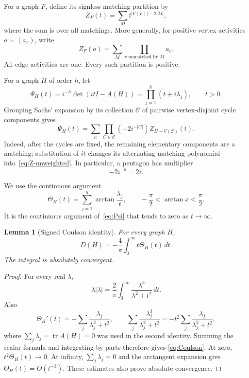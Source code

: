 \documentclass[11pt]{article}
\newtheorem{lemma}[theorem]{Lemma}
\theoremstyle{remark}
\newcommand{\tr}{\operatorname{tr}}
\begin{document}
For a graph $F$, define its signless matching partition by
\begin{equation}\label{eq:Z-unweighted}
 Z_F(t)=\sum_M t^{|V(F)|-2|M|},
\end{equation}
where the sum is over all matchings.  More generally, for positive vertex
activities $a=(a_v)$, write
\begin{equation}\label{eq:Z-weighted}
 Z_F(a)=\sum_M\prod_{v\text{ unmatched by }M}a_v.
\end{equation}
All edge activities are one.  Every such partition is positive.

For a graph $H$ of order $h$, let
\begin{equation}\label{eq:Psi}
 \Psi_H(t)=i^{-h}\det(itI-A(H))
          =\prod_{j=1}^h(t+i\lambda_j),
 \qquad t>0.
\end{equation}
Grouping Sachs' expansion by its collection $\mathcal C$ of pairwise
vertex-disjoint cycle components gives
\begin{equation}\label{eq:Sachs}
 \Psi_H(t)=\sum_{\mathcal C}
 \prod_{C\in\mathcal C}(-2i^{-|C|})
 Z_{H-V(\mathcal C)}(t).
\end{equation}
Indeed, after the cycles are fixed, the remaining elementary components are
a matching; substitution of $it$ changes its alternating matching polynomial
into~\eqref{eq:Z-unweighted}.  In particular, a pentagon has multiplier
\begin{equation}\label{eq:C5-multiplier}
 -2i^{-5}=2i.
\end{equation}

We use the continuous argument
\begin{equation}\label{eq:continuous-argument}
 \Theta_H(t)=\sum_{j=1}^h\arctan\frac{\lambda_j}{t},
 \qquad -\frac\pi2<\arctan x<\frac\pi2.
\end{equation}
It is the continuous argument of~\eqref{eq:Psi} that tends to zero as
$t\to\infty$.

\begin{lemma}[Signed Coulson identity]\label{lem:coulson}
For every graph $H$,
\begin{equation}\label{eq:Coulson}
 D(H)=-\frac4\pi\int_0^\infty t\Theta_H(t)\,dt.
\end{equation}
The integral is absolutely convergent.
\end{lemma}

\begin{proof}
For every real $\lambda$,
\[
 \lambda|\lambda|=\frac2\pi\int_0^\infty
 \frac{\lambda^3}{\lambda^2+t^2}\,dt.
\]
Also
\[
 \Theta_H'(t)=-\sum_j\frac{\lambda_j}{\lambda_j^2+t^2},
 \qquad
 \sum_j\frac{\lambda_j^3}{\lambda_j^2+t^2}
 =-t^2\sum_j\frac{\lambda_j}{\lambda_j^2+t^2},
\]
where $\sum_j\lambda_j=\tr A(H)=0$ was used in the second identity.
Summing the scalar formula and integrating by parts therefore gives
\eqref{eq:Coulson}.  At zero, $t^2\Theta_H(t)\to0$.  At infinity,
$\sum_j\lambda_j=0$ and the arctangent expansion give
$\Theta_H(t)=O(t^{-3})$.  These estimates also prove absolute convergence.
\end{proof}
\end{document}
